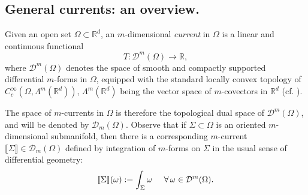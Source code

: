 \documentclass[a4paper,11pt,reqno]{amsart}
\theoremstyle{definition}
\numberwithin{equation}{section}
\numberwithin{subsection}{section}
\newcommand{\R}{\mathbb{R}}
\newcommand{\D}{\mathcal{D}}
\begin{document}
\subsection{General currents: an overview.} 




\medskip

Given an open set $\Omega \subset \R^d$, an $m$-dimensional \emph{current} in $\Omega$ is a linear and continuous functional
\[
T \colon \D^{m}(\Omega) \to \R,
\]
where $\D^{m}(\Omega)$ denotes the space of smooth and compactly supported differential $m$-forms in $\Omega$, equipped with the standard locally convex topology of $C^{\infty}_{c}(\Omega, \Lambda^{m}(\R^{d}))$, $\Lambda^{m}(\R^{d})$ being the vector space of $m$-covectors in $\R^{d}$ (cf. \cite[Sections 25 and 26]{Sim83}).

The space of $m$-currents in $\Omega$ is therefore the topological dual space of $\D^{m}(\Omega)$, and will be denoted by $\D_{m}(\Omega)$. Observe that if $\Sigma \subset \Omega$ is an oriented $m$-dimensional submanifold, then there is a corresponding $m$-current $\llbracket \Sigma \rrbracket \in \D_{m}(\Omega)$ defined by integration of $m$-forms on $\Sigma$ in the usual sense of differential geometry:
\[
\llbracket \Sigma \rrbracket(\omega) := \int_{\Sigma} \omega \hspace{0.5cm} \forall \, \omega \in \D^{m}(\Omega).
\] 
\end{document}
